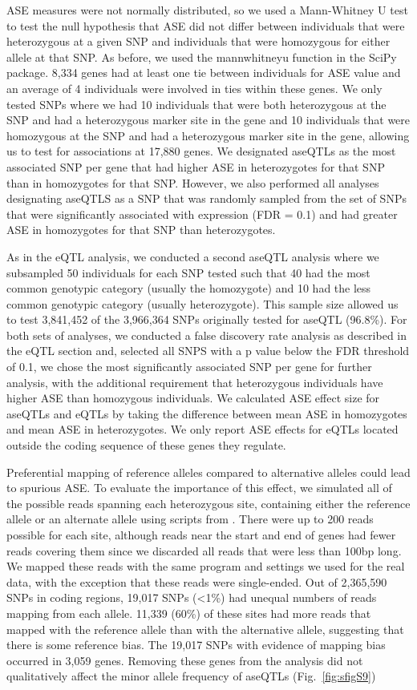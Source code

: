 ASE measures were not normally distributed, so we used a Mann-Whitney U test to test the null hypothesis that ASE did not differ between individuals that were heterozygous at a given SNP and individuals that were homozygous for either allele at that SNP. As before, we used the mannwhitneyu function in the SciPy package. 8,334 genes had at least one tie between individuals for ASE value and an average of 4 individuals were involved in ties within these genes. We only tested SNPs where we had 10 individuals that were both heterozygous at the SNP and had a heterozygous marker site in the gene and 10 individuals that were homozygous at the SNP and had a heterozygous marker site in the gene, allowing us to test for associations at 17,880 genes. We designated aseQTLs as the most associated SNP per gene that had higher ASE in heterozygotes for that SNP than in homozygotes for that SNP. However, we also performed all analyses designating aseQTLS as a SNP that was randomly sampled from the set of SNPs that were significantly associated with expression (FDR = 0.1) and had greater ASE in homozygotes for that SNP than heterozygotes.

As in the eQTL analysis, we conducted a second aseQTL analysis where we subsampled 50 individuals for each SNP tested such that 40 had the most common genotypic category (usually the homozygote) and 10 had the less common genotypic category (usually heterozygote). This sample size allowed us to test 3,841,452 of the 3,966,364 SNPs originally tested for aseQTL (96.8\%). For both sets of analyses, we conducted a false discovery rate analysis as described in the eQTL section and, selected all SNPS with a p value below the FDR threshold of 0.1, we chose the most significantly associated SNP per gene for further analysis, with the additional requirement that heterozygous individuals have higher ASE than homozygous individuals. We calculated ASE effect size for aseQTLs and eQTLs by taking the difference between mean ASE in homozygotes and mean ASE in heterozygotes. We only report ASE effects for eQTLs located outside the coding sequence of these genes they regulate.

Preferential mapping of reference alleles compared to alternative alleles could lead to spurious ASE. To evaluate the importance of this effect, we simulated all of the possible reads spanning each heterozygous site, containing either the reference allele or an alternate allele using scripts from \citep{Degner2009-nj}. There were up to 200 reads possible for each site, although reads near the start and end of genes had fewer reads covering them since we discarded all reads that were less than 100bp long. We mapped these reads with the same program and settings we used for the real data, with the exception that these reads were single-ended.  Out of 2,365,590 SNPs in coding regions, 19,017 SNPs (\textless1\%) had unequal numbers of reads mapping from each allele. 11,339 (60\%) of these sites had more reads that mapped with the reference allele than with the alternative allele, suggesting that there is some reference bias. The 19,017 SNPs with evidence of mapping bias occurred in 3,059 genes. Removing these genes from the analysis did not qualitatively affect the minor allele frequency of aseQTLs (Fig.~\ref{fig:sfigS9})

